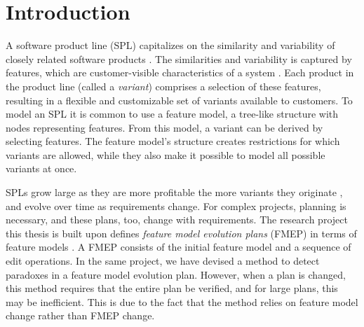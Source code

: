 \chapter{Introduction}

A software product line (SPL) capitalizes on the similarity and variability of closely related software products \cite{book:introduction-to-spl}. The similarities and variability is captured by features, which are customer-visible characteristics of a system \cite{book:introduction-to-spl}. Each product in the product line (called a \textit{variant}) comprises a selection of these features, resulting in a flexible and customizable set of variants available to customers. To model an SPL it is common to use a feature model, a tree-like structure with nodes representing features. From this model, a variant can be derived by selecting features. The feature model's structure creates restrictions for which variants are allowed, while they also make it possible to model all possible variants at once.

SPLs grow large as they are more profitable the more variants they originate \cite{book:introduction-to-spl}, %
and evolve over time as requirements change. For complex projects, planning is necessary, and these plans, too, change with requirements. The research project this thesis is built upon defines \emph{feature model evolution plans} (FMEP) in terms of feature models \cite{art:consistency-preserving-evolution-planning}. A FMEP consists of the initial feature model and a sequence of edit operations. In the same project, we have devised a method to detect paradoxes in a feature model evolution plan.  However, when a plan is changed, this method requires that the entire plan be verified, and for large plans, this may be inefficient. This is due to the fact that the method relies on feature model change rather than FMEP change. 




